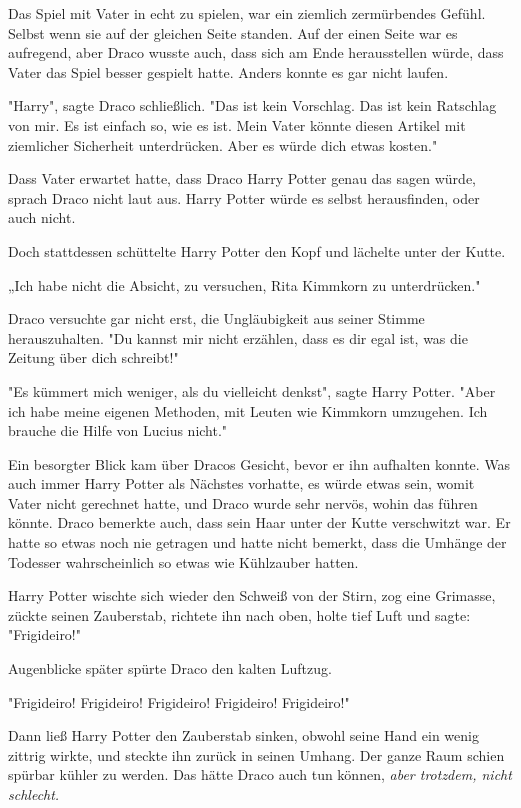 {Das Spiel mit Vater in echt zu spielen, war ein ziemlich zermürbendes Gefühl. Selbst wenn sie auf der gleichen Seite standen. Auf der einen Seite war es aufregend, aber Draco wusste auch, dass sich am Ende herausstellen würde, dass Vater das Spiel besser gespielt hatte. Anders konnte es gar nicht laufen.

"Harry", sagte Draco schließlich. "Das ist kein Vorschlag. Das ist kein Ratschlag von mir. Es ist einfach so, wie es ist. Mein Vater könnte diesen Artikel mit ziemlicher Sicherheit unterdrücken. Aber es würde dich etwas kosten."

Dass Vater erwartet hatte, dass Draco Harry Potter genau das sagen würde, sprach Draco nicht laut aus. Harry Potter würde es selbst herausfinden, oder auch nicht.

Doch stattdessen schüttelte Harry Potter den Kopf und lächelte unter der Kutte.

„Ich habe nicht die Absicht, zu versuchen, Rita Kimmkorn zu unterdrücken."

Draco versuchte gar nicht erst, die Ungläubigkeit aus seiner Stimme herauszuhalten. "Du kannst mir nicht erzählen, dass es dir egal ist, was die Zeitung über dich schreibt!"

"Es kümmert mich weniger, als du vielleicht denkst", sagte Harry Potter. "Aber ich habe meine eigenen Methoden, mit Leuten wie Kimmkorn umzugehen. Ich brauche die Hilfe von Lucius nicht."

Ein besorgter Blick kam über Dracos Gesicht, bevor er ihn aufhalten konnte. Was auch immer Harry Potter als Nächstes vorhatte, es würde etwas sein, womit Vater nicht gerechnet hatte, und Draco wurde sehr nervös, wohin das führen könnte. Draco bemerkte auch, dass sein Haar unter der Kutte verschwitzt war. Er hatte so etwas noch nie getragen und hatte nicht bemerkt, dass die Umhänge der Todesser wahrscheinlich so etwas wie Kühlzauber hatten.

Harry Potter wischte sich wieder den Schweiß von der Stirn, zog eine Grimasse, zückte seinen Zauberstab, richtete ihn nach oben, holte tief Luft und sagte: "Frigideiro!"

Augenblicke später spürte Draco den kalten Luftzug.

"Frigideiro! Frigideiro! Frigideiro! Frigideiro! Frigideiro!"

Dann ließ Harry Potter den Zauberstab sinken, obwohl seine Hand ein wenig zittrig wirkte, und steckte ihn zurück in seinen Umhang. Der ganze Raum schien spürbar kühler zu werden. Das hätte Draco auch tun können, \emph{aber trotzdem, nicht schlecht.}

}
